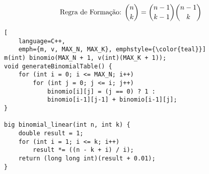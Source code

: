 \begin{displaymath}
	\text{Regra de Formação: }
	\binom{n}{k}=\binom{n-1}{k-1}\binom{n-1}{k}\\\\
\end{displaymath}

\begin{lstlisting}[
    language=C++,
    emph={m, v, MAX_N, MAX_K}, emphstyle={\color{teal}}]
m(int) binomio(MAX_N + 1, v(int)(MAX_K + 1));
void generateBinomialTable() {
    for (int i = 0; i <= MAX_N; i++)
		for (int j = 0; j <= i; j++)
			binomio[i][j] = (j == 0) ? 1 :
            binomio[i-1][j-1] + binomio[i-1][j];
}

big binomial_linear(int n, int k) {
    double result = 1;
    for (int i = 1; i <= k; i++)
        result *= ((n - k + i) / i);
    return (long long int)(result + 0.01);
}
\end{lstlisting}